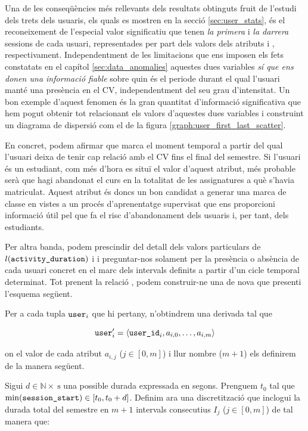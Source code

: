 \documentclass[
	a4paper,
	twoside,
	justified
]{tufte-book}
\begin{document}
Una de les conseqüències més rellevants dels resultats obtinguts fruit de l'estudi dels trets dels usuaris, els quals es mostren en la secció \ref{sec:user_stats}, és el reconeixement de l'especial valor significatiu que tenen \emph{la primera} i \emph{la darrera} sessions de cada usuari, representades per part dels valors dels atributs  i ,  respectivament. Independentment de les limitacions que ens imposen els fets constatats en el capítol \ref{sec:data_anomalies} aquestes dues variables \emph{sí que ens donen una informació fiable} sobre quin és el periode durant el qual l'usuari manté una presència en el CV, independentment del seu grau d'intensitat. Un bon exemple d'aquest fenomen és la gran quantitat d'informació significativa que hem pogut obtenir tot relacionant els valors d'aquestes dues variables i construint un diagrama de dispersió com el de la figura \ref{graph:user_first_last_scatter}.

En concret, podem afirmar que  marca el moment temporal a partir del qual l'usuari deixa de tenir cap relació amb el CV fins el final del semestre. Si l'usuari és un estudiant, com més d'hora es situï el valor d'aquest atribut, més probable serà que hagi abandonat el curs en la totalitat de les assignatures a què s'havia matriculat. Aquest atribut és doncs un bon candidat a generar una marca de classe en vistes a un procés d'aprenentatge supervisat que ens proporcioni informació útil pel que fa el risc d'abandonament dels usuaris i, per tant, dels estudiants.  

Per altra banda, podem prescindir del detall dels valors particulars de $l(\texttt{activity\_duration})$ i  i preguntar-nos solament per la presència o absència de cada usuari concret en el marc dels intervals definits a partir d'un cicle temporal determinat. Tot prenent la relació , podem construir-ne una de nova que presenti l'esquema següent. 

Per a cada tupla $\texttt{user}_i$ que hi pertany, n'obtindrem una derivada tal que  

$$
	\texttt{user}_i^{\prime} = 
		\langle \texttt{user\_id}_i, a_{i,0}, \ldots, a_{i,m} \rangle
$$

 on el valor de cada atribut $a_{i,j}$ ($j \in [0,m]$) i llur nombre ($m+1$) els definirem de la manera següent. 
 
 Sigui $d \in \mathbb{N} \times \SI{}{\second}$ una possible durada expressada en segons. Prenguem $t_0$ tal que $\min(\texttt{session\_start}) \in [t_0, t_0 + d]$. Definim ara una discretització que inclogui la durada total del semestre en $m+1$ intervals consecutius $I_j$ ($j \in [0,m]$) de tal manera que:
\end{document}
